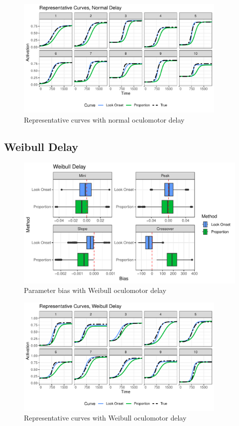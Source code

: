 \documentclass{article}
\begin{document}
\begin{figure}[H]
\centering
\includegraphics[width=0.9\textwidth]{rep_curves_normal_delay.pdf}
\caption{Representative curves with normal oculomotor delay}
\label{fig:rep_curves_normal_delay}
\end{figure}

\subsection{Weibull Delay}



\begin{figure}[H]
\centering
\includegraphics[scale=1]{weibull_delay_bar_plot.pdf}
\caption{Parameter bias with Weibull oculomotor delay}
\label{fig:par_bias_weibull_delay}
\end{figure}

\begin{figure}[H]
\centering
\includegraphics[width=0.9\textwidth]{rep_curves_weibull_delay.pdf}
\caption{Representative curves with Weibull oculomotor delay}
\label{fig:rep_curves_weibull_delay}
\end{figure}
\end{document}
